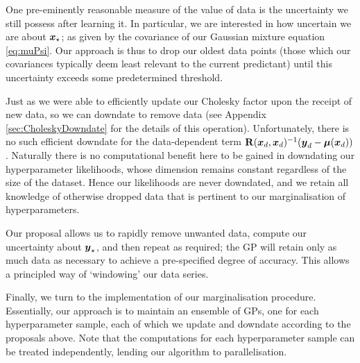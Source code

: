 \documentclass{acmsmall}
\begin{document}
One pre-eminently reasonable measure of the value of data is the uncertainty we still possess after learning it. In particular, we are interested in how uncertain we are about $\boldsymbol{x}_\star$; as given by the covariance of our Gaussian mixture equation \eqref{eq:muPsi}. Our approach is thus to drop our oldest data points (those which our covariances typically deem least relevant to the current predictant) until this uncertainty exceeds some predetermined threshold. 

Just as we were able to efficiently update our Cholesky factor upon the receipt of new data, so we can downdate to remove data (see Appendix \ref{sec:CholeskyDowndate} for the details of this operation). Unfortunately, there is no such efficient downdate for the data-dependent term $\mathbf{R}(\boldsymbol{x}_d,\boldsymbol{x}_d)^{-1}(\boldsymbol{y}_d-\boldsymbol{\mu}(\boldsymbol{x}_d))$. Naturally there is no computational benefit here to be gained in downdating our hyperparameter likelihoods, whose dimension remains constant regardless of the size of the dataset. Hence our likelihoods are never downdated, and we retain all knowledge of otherwise dropped data that is pertinent to our marginalisation of hyperparameters. 

Our proposal allows us to rapidly remove unwanted data, compute our uncertainty about $\boldsymbol{y}_\star$, and then repeat as required; the GP will retain only as much data as necessary to achieve a pre-specified degree of accuracy. This allows a principled way of `windowing' our data series.

Finally, we turn to the implementation of our marginalisation procedure. Essentially, our approach is to maintain an ensemble of GPs, one for each hyperparameter sample, each of which we update and downdate according to the proposals above. Note that the computations for each hyperparameter sample can be treated independently, lending our algorithm to parallelisation. 
\end{document}
